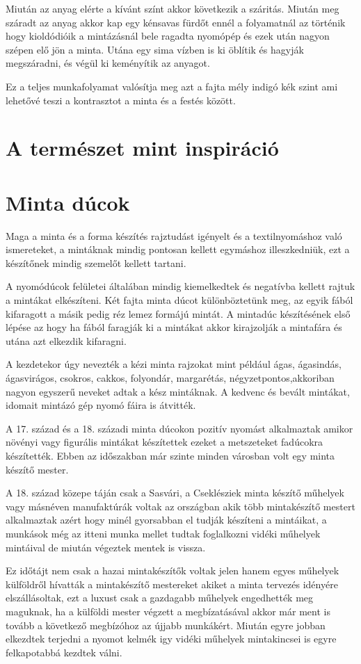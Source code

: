 \documentclass[fontsize=12pt, appendixprefix=true]{scrreprt}
\begin{document}
Miután az anyag elérte a kívánt színt akkor következik a száritás. Miután meg száradt az anyag akkor kap egy kénsavas fürdőt ennél a folyamatnál az történik hogy kioldódióik a mintázásnál bele ragadta nyomópép és ezek után nagyon szépen elő jön a minta. Utána egy sima vízben is ki öblítik és hagyják megszáradni, és végül ki keményítik az anyagot.

Ez a teljes munkafolyamat valósítja  meg azt a fajta mély indigó kék szint ami lehetővé teszi a kontrasztot a minta és a festés között.


\section{A természet mint inspiráció}
\section{Minta dúcok}
Maga a minta és a forma készítés rajztudást igényelt és a textilnyomáshoz való ismereteket, a mintáknak mindig pontosan kellett egymáshoz illeszkedniük, ezt a készítőnek mindig szemelőt kellett tartani.

A nyomódúcok felületei általában mindig kiemelkedtek és negatívba kellett rajtuk a mintákat elkészíteni. Két fajta minta dúcot különböztetünk meg, az egyik fából kifaragott a másik pedig réz lemez formájú mintát. A mintadúc készítésének első lépése az hogy ha fából faragják ki a mintákat akkor kirajzolják a mintafára és utána azt elkezdik kifaragni. 

A kezdetekor úgy nevezték a kézi minta rajzokat mint például ágas, ágasindás, ágasvirágos, csokros, cakkos, folyondár, margarétás, négyzetpontos,akkoriban nagyon egyszerű neveket adtak a kész mintáknak. A kedvenc és bevált mintákat, idomait mintázó gép nyomó fáira is átvitték.

A 17. század és a 18. századi minta dúcokon pozitív nyomást alkalmaztak amikor növényi vagy figurális mintákat készítettek ezeket a metszeteket fadúcokra készítették. Ebben az időszakban már szinte minden városban volt egy minta készítő mester.

A 18. század közepe táján csak a Sasvári, a Cseklésziek minta készítő műhelyek vagy másnéven manufaktúrák  voltak az országban akik több mintakészítő mestert alkalmaztak azért hogy minél gyorsabban el tudják készíteni a mintáikat, a munkások még az itteni munka mellet tudtak foglalkozni vidéki műhelyek mintáival de miután végeztek mentek is vissza. 

Ez időtájt nem csak a hazai mintakészítők voltak jelen hanem egyes műhelyek külföldről hívatták a mintakészítő mestereket akiket a minta tervezés idényére elszállásoltak, ezt a luxust csak a gazdagabb műhelyek engedhették meg maguknak, ha a külföldi mester végzett a megbízatásával akkor már ment is tovább a következő megbízóhoz az újjabb munkákért.
Miután egyre jobban elkezdtek terjedni a nyomot kelmék igy vidéki műhelyek mintakincsei is egyre felkapotabbá kezdtek válni.
\end{document}
